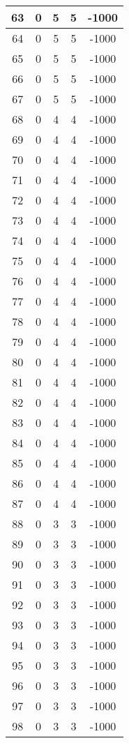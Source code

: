 \documentclass[letterpaper, 12pt]{article}
\begin{document}
\begin{longtable}{|c|c|c|c|c|}
\hline
63 & 0 & 5 & 5 & -1000 \\
\hline
64 & 0 & 5 & 5 & -1000 \\
\hline
65 & 0 & 5 & 5 & -1000 \\
\hline
66 & 0 & 5 & 5 & -1000 \\
\hline
67 & 0 & 5 & 5 & -1000 \\
\hline
68 & 0 & 4 & 4 & -1000 \\
\hline
69 & 0 & 4 & 4 & -1000 \\
\hline
70 & 0 & 4 & 4 & -1000 \\
\hline
71 & 0 & 4 & 4 & -1000 \\
\hline
72 & 0 & 4 & 4 & -1000 \\
\hline
73 & 0 & 4 & 4 & -1000 \\
\hline
74 & 0 & 4 & 4 & -1000 \\
\hline
75 & 0 & 4 & 4 & -1000 \\
\hline
76 & 0 & 4 & 4 & -1000 \\
\hline
77 & 0 & 4 & 4 & -1000 \\
\hline
78 & 0 & 4 & 4 & -1000 \\
\hline
79 & 0 & 4 & 4 & -1000 \\
\hline
80 & 0 & 4 & 4 & -1000 \\
\hline
81 & 0 & 4 & 4 & -1000 \\
\hline
82 & 0 & 4 & 4 & -1000 \\
\hline
83 & 0 & 4 & 4 & -1000 \\
\hline
84 & 0 & 4 & 4 & -1000 \\
\hline
85 & 0 & 4 & 4 & -1000 \\
\hline
86 & 0 & 4 & 4 & -1000 \\
\hline
87 & 0 & 4 & 4 & -1000 \\
\hline
88 & 0 & 3 & 3 & -1000 \\
\hline
89 & 0 & 3 & 3 & -1000 \\
\hline
90 & 0 & 3 & 3 & -1000 \\
\hline
91 & 0 & 3 & 3 & -1000 \\
\hline
92 & 0 & 3 & 3 & -1000 \\
\hline
93 & 0 & 3 & 3 & -1000 \\
\hline
94 & 0 & 3 & 3 & -1000 \\
\hline
95 & 0 & 3 & 3 & -1000 \\
\hline
96 & 0 & 3 & 3 & -1000 \\
\hline
97 & 0 & 3 & 3 & -1000 \\
\hline
98 & 0 & 3 & 3 & -1000 \\

\end{longtable}
\end{document}
